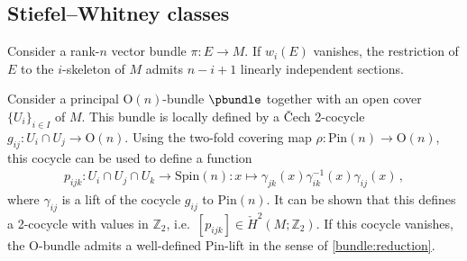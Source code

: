 \subsection{Stiefel--Whitney classes}\label{section:stiefel_whitney}


    \begin{property}
        Consider a rank-$n$ vector bundle $\pi:E\rightarrow M$. If $w_i(E)$ vanishes, the restriction of $E$ to the $i$-skeleton of $M$ admits $n-i+1$ linearly independent sections.
    \end{property}

    Consider a principal $\mathrm{O}(n)$-bundle $\pbundle$ together with an open cover $\{U_i\}_{i\in I}$ of $M$. This bundle is locally defined by a \v{C}ech 2-cocycle $g_{ij}:U_i\cap U_j\rightarrow\mathrm{O}(n)$. Using the two-fold covering map $\rho:\mathrm{Pin}(n)\rightarrow\mathrm{O}(n)$, this cocycle can be used to define a function
    \begin{gather}
        p_{ijk}:U_i\cap U_j\cap U_k\rightarrow\mathrm{Spin}(n):x\mapsto\gamma_{jk}(x)\gamma^{-1}_{ik}(x)\gamma_{ij}(x)\,,
    \end{gather}
    where $\gamma_{ij}$ is a lift of the cocycle $g_{ij}$ to $\mathrm{Pin}(n)$. It can be shown that this defines a 2-cocycle with values in $\mathbb{Z}_2$, i.e.~$[p_{ijk}]\in\check{H}^2(M;\mathbb{Z}_2)$. If this cocycle vanishes, the $\mathrm{O}$-bundle admits a well-defined $\text{Pin}$-lift in the sense of \cref{bundle:reduction}.

